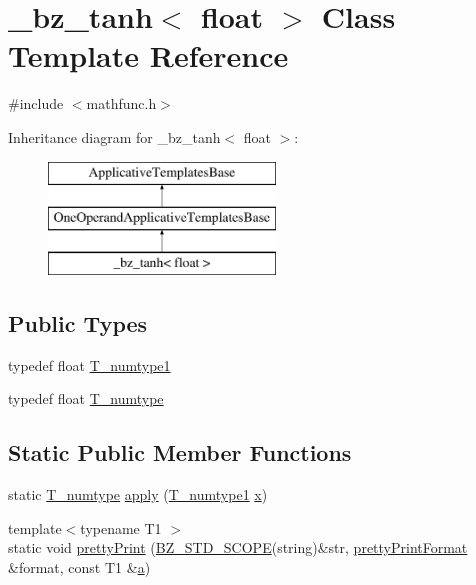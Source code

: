 \hypertarget{class__bz__tanh_3_01float_01_4}{}\section{\+\_\+bz\+\_\+tanh$<$ float $>$ Class Template Reference}
\label{class__bz__tanh_3_01float_01_4}


{\ttfamily \#include $<$mathfunc.\+h$>$}

Inheritance diagram for \+\_\+bz\+\_\+tanh$<$ float $>$\+:\begin{figure}[H]
\begin{center}
\leavevmode
\includegraphics[height=3.000000cm]{class__bz__tanh_3_01float_01_4}
\end{center}
\end{figure}
\subsection*{Public Types}
\begin{DoxyCompactItemize}
\item 
typedef float \hyperlink{class__bz__tanh_3_01float_01_4_a41bc2191550ca688affd8d310e2ec53f}{T\+\_\+numtype1}
\item 
typedef float \hyperlink{class__bz__tanh_3_01float_01_4_ac3806208221f32bbdfad8442c4f96449}{T\+\_\+numtype}
\end{DoxyCompactItemize}
\subsection*{Static Public Member Functions}
\begin{DoxyCompactItemize}
\item 
static \hyperlink{class__bz__tanh_3_01float_01_4_ac3806208221f32bbdfad8442c4f96449}{T\+\_\+numtype} \hyperlink{class__bz__tanh_3_01float_01_4_a7d08704795f34b58ee0d7b8b6fceee06}{apply} (\hyperlink{class__bz__tanh_3_01float_01_4_a41bc2191550ca688affd8d310e2ec53f}{T\+\_\+numtype1} \hyperlink{vecnorm1_8cc_ac73eed9e41ec09d58f112f06c2d6cb63}{x})
\item 
{\footnotesize template$<$typename T1 $>$ }\\static void \hyperlink{class__bz__tanh_3_01float_01_4_aef8a93d1740301a5db1075debcd6f622}{pretty\+Print} (\hyperlink{numinquire_8h_a2b24ffc3b4ef9803956bc7715c6c7b83}{B\+Z\+\_\+\+S\+T\+D\+\_\+\+S\+C\+O\+P\+E}(string)\&str, \hyperlink{classprettyPrintFormat}{pretty\+Print\+Format} \&format, const T1 \&\hyperlink{gen__mat5files_8m_aae328bf20413f220e38aec4d95bfd6da}{a})
\end{DoxyCompactItemize}



